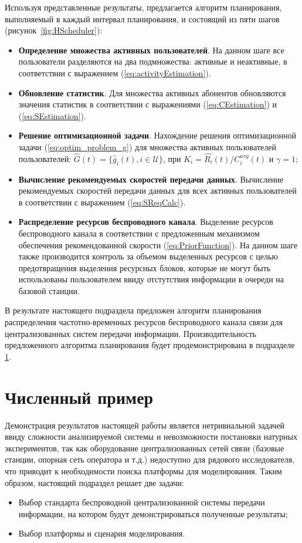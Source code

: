Используя представленные результаты, предлагается алгоритм планирования, выполняемый в каждый интервал планирования, и состоящий из пяти шагов (рисунок~\ref{fig:HScheduler}):
\begin{itemize}
	\item \textbf{Определение множества активных пользователей}. На данном шаге все пользователи разделяются на два подмножества: активные и неактивные, в соответствии с выражением (\ref{eq:activityEstimation}).
	\item \textbf{Обновление статистик}. Для множества активных абонентов обновляются значения статистик в соответствии с выражениями (\ref{eq:CEstimation}) и (\ref{eq:SEstimation}).
	\item \textbf{Решение оптимизационной задачи}. Нахождение решения оптимизационной задачи (\ref{eq:optim_problem_g}) для множества активных пользователей пользователей: $\hat{G}(t) = \{\hat{g}_i(t), i \in \mathcal{U}\}$, при $K_i = \hat{R_i}(t) / C^{avg}_i(t)$ и $\gamma = 1$;
	\item \textbf{Вычисление рекомендуемых скоростей передачи данных}. Вычисление рекомендуемых скоростей передачи данных для всех активных пользователей в соответствии с выражением (\ref{eq:SReqCalc}).
	\item \textbf{Распределение ресурсов беспроводного канала}. Выделение ресурсов беспроводного канала в соответствии с предложенным механизмом обеспечения рекомендованной скорости (\ref{eq:PriorFunction}). На данном шаге также производится контроль за объемом выделенных ресурсов с целью предотвращения выделения ресурсных блоков, которые не могут быть использованы пользователем ввиду отстутствия информации в очереди на базовой станции.
\end{itemize}

В результате настоящего подраздела предложен алгоритм планирования распределения частотно-временных ресурсов беспроводного канала связи для централизованных систем передачи информации. Производительность предложенного алгоритма планирования будет продемонстрирована в подразделе \ref{chap3:NumericalExample}.

\section{Численный пример}
\label{chap3:NumericalExample}

Демонстрация результатов настоящей работы является нетривиальной задачей ввиду сложности анализируемой системы и невозможности постановки натурных экспериментов, так как оборудование централизованных сетей связи (базовые станции, опорная сеть оператора и т.д.) недоступно для рядового исследователя, что приводит к необходимости поиска платформы для моделирования. Таким образом, настоящий подраздел решает две задачи:
\begin{itemize}
	\item Выбор стандарта беспроводной централизованной системы передачи информации, на котором будут демонстрироваться полученные результаты;
	\item Выбор платформы и сценария моделирования.
\end{itemize}


